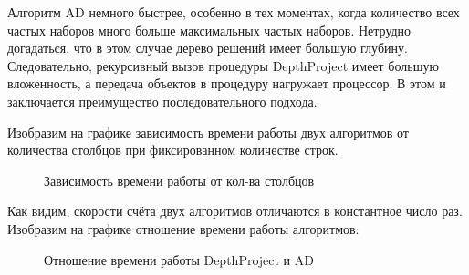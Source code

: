 \documentclass[a4paper, 12pt, oneside]{scrartcl}
\begin{document}
Алгоритм AD немного быстрее, особенно в тех моментах, когда количество всех частых наборов много больше максимальных частых наборов. Нетрудно догадаться, что в этом случае дерево решений имеет большую глубину. Следовательно, рекурсивный вызов процедуры DepthProject имеет большую вложенность, а передача объектов в процедуру нагружает процессор. В этом и заключается преимущество последовательного подхода.

\newpage

Изобразим на графике зависимость времени работы двух алгоритмов от количества столбцов при фиксированном количестве строк.

\begin{figure}[H]
\caption{Зависимость времени работы от кол-ва столбцов}
\label{fig:image}
\end{figure}

Как видим, скорости счёта двух алгоритмов отличаются в константное число раз. Изобразим на графике отношение времени работы алгоритмов:

\begin{figure}[H]
\caption{Отношение времени работы DepthProject и AD}
\label{fig:image}
\end{figure}
\end{document}
